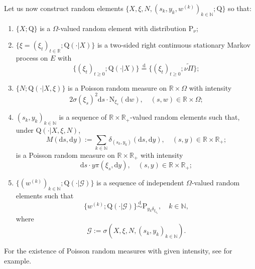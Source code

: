 \documentclass[12pt,a4paper]{amsart}
\numberwithin{equation}{section}
\theoremstyle{plain}
\theoremstyle{definition}
\theoremstyle{remark}
\begin{document}
	Let us now construct random elements
  	$\big\{X, \xi, N, (s_k, y_k,w^{(k)})_{k\in \mathbb N}; \mathrm Q\big\}$ so that:
\begin{enumerate}[label=(Q\arabic*),ref=Q\arabic*]
\item \label{asp:Q1}
	$\{X;\mathrm Q\}$ is a $\Omega$-valued random element with distribution $\mathrm P_\nu$;
\item \label{asp:Q2}
		$\{\xi = (\xi_t)_{t\in \mathbb R}; \mathrm Q(\cdot | X)\}$ is a two-sided right continuous stationary Markov process on $E$ with
		 \[\{(\xi_t)_{t \geq 0}; \mathrm Q(\cdot | X)\} \overset{\text{d}} = \{(\xi_t)_{t \geq 0}; \widetilde{\nu\Pi}\};\]
\item \label{asp:Q3}
	$\{N; \mathrm Q(\cdot |X,\xi)\}$ is a Poisson random measure on $\mathbb R\times \Omega$ with intensity
\[
	2 \sigma(\xi_s)^2 {\mathrm d}s \cdot \mathrm N_{\xi_s}({\mathrm d}w),
	\quad (s,w)\in \mathbb R\times \Omega;
\]
\item \label{asp:Q4}
	$(s_k, y_k)_{k\in \mathbb N}$ is a sequence of $\mathbb R \times \mathbb R_+$-valued random elements
	such that, under $\mathrm Q(\cdot | X, \xi, N)$,
\[
	M(\mathrm ds,\mathrm dy)
	:= \sum_{k\in \mathbb N} \delta_{(s_k, y_k)}(\mathrm ds,\mathrm dy), \quad (s,y)\in \mathbb R \times \mathbb R_+;
\]	
is a Poisson random measure on $\mathbb R \times \mathbb R_+$ with intensity
\[
	\mathrm ds \cdot y \pi(\xi_s, \mathrm dy), \quad (s,y)\in \mathbb R \times \mathbb R_+;
\]
\item \label{asp:Q5}
	$\{(w^{(k)})_{k\in \mathbb N}; \mathrm Q(\cdot|\mathscr G)\}$ is a sequence of independent $\Omega$-valued random elements such that
\[
	\{w^{(k)}; \mathrm Q(\cdot| \mathscr G)\}
	\overset{\text{d}}\sim \mathrm P_{y_k\delta_{\xi_{s_k}}},
	\quad k\in \mathbb N,
\]
	where
\[
	\mathscr G
	:= \sigma(X, \xi, N, (s_k, y_k)_{k\in \mathbb N}).
\]
\end{enumerate}
	For the existence of Poisson random measures with given intensity, see \cite[Theorem 2.4]{Kyprianou2014Fluctuations} for example.
	
\end{document}
